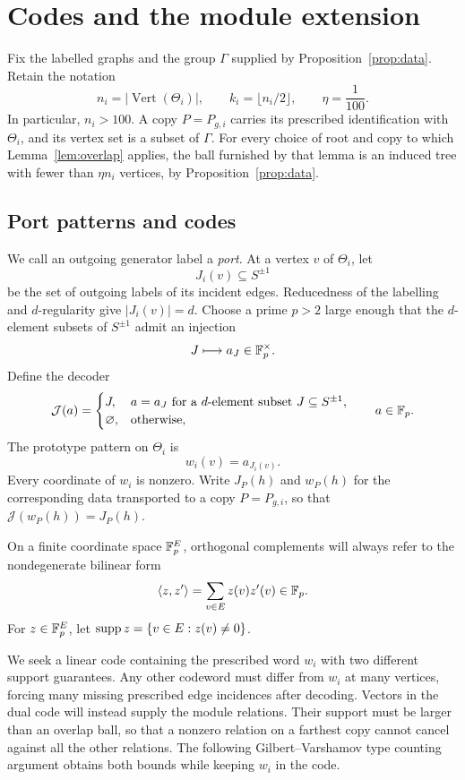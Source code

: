 \section{Codes and the module extension}
\label{sec:module}

Fix the labelled graphs and the group \(\Gamma\) supplied by
Proposition~\ref{prop:data}.  Retain the notation
\[
  n_i=|\operatorname{Vert}(\Theta_i)|,\qquad
  k_i=\lfloor n_i/2\rfloor,\qquad \eta=\frac1{100}.
\]
In particular, \(n_i>100\).  A copy \(P=P_{g,i}\) carries its prescribed
identification with \(\Theta_i\), and its vertex set is a subset of \(\Gamma\).
For every choice of root and copy to which Lemma~\ref{lem:overlap} applies,
the ball furnished by that lemma is an induced tree with fewer than
\(\eta n_i\) vertices, by Proposition~\ref{prop:data}.

\subsection{Port patterns and codes}

We call an outgoing generator label a \emph{port}.
At a vertex \(v\) of \(\Theta_i\), let
\[
  J_i(v)\subseteq S^{\pm1}
\]
be the set of outgoing labels of its incident edges.  Reducedness of the
labelling and \(d\)-regularity give \(|J_i(v)|=d\).  Choose a prime \(p>2\)
large enough that the \(d\)-element subsets of \(S^{\pm1}\) admit an
injection
\[
  J\longmapsto a_J\in\mathbb F_p^\times.
\]
Define the decoder
\[
  \mathcal J(a)=
  \begin{cases}
    J,&a=a_J\text{ for a \(d\)-element subset }J\subseteq S^{\pm1},\\
    \varnothing,&\text{otherwise},
  \end{cases}
  \qquad a\in\mathbb F_p.
\]
The prototype pattern on \(\Theta_i\) is
\[
  w_i(v)=a_{J_i(v)}.
\]
Every coordinate of \(w_i\) is nonzero.  Write \(J_P(h)\) and \(w_P(h)\)
for the corresponding data transported to a copy \(P=P_{g,i}\), so that
\(\mathcal J(w_P(h))=J_P(h)\).

On a finite coordinate space \(\mathbb F_p^E\), orthogonal complements will
always refer to the nondegenerate bilinear form
\[
  \langle z,z'\rangle=\sum_{v\in E}z(v)z'(v)\in\mathbb F_p.
\]
For \(z\in\mathbb F_p^E\), let \(\operatorname{supp} z=\{v\in E:z(v)\ne0\}\).

We seek a linear code containing the prescribed word $w_i$ with two
different support guarantees. Any other codeword must differ from $w_i$
at many vertices, forcing many missing prescribed edge incidences after
decoding. Vectors in the dual code will instead supply the module
relations. Their support must be larger than an overlap ball, so that a
nonzero relation on a farthest copy cannot cancel against all the other
relations. The following Gilbert--Varshamov type counting argument
\cite{Gilbert1952,Varshamov1957} obtains both bounds while keeping $w_i$
in the code.

